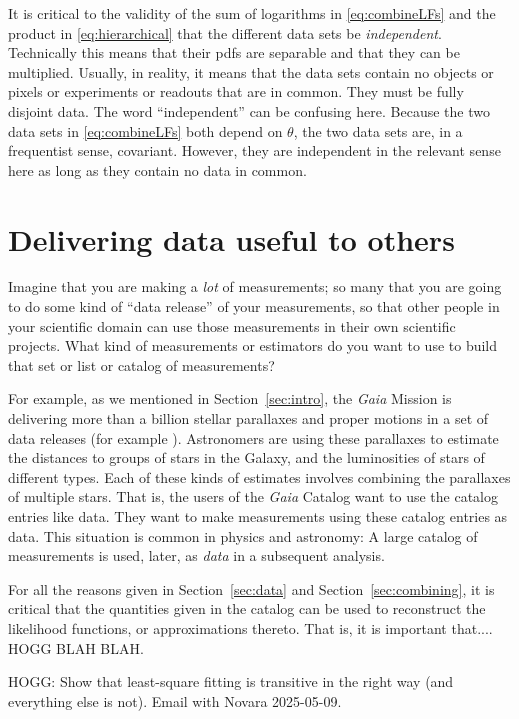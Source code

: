 \documentclass{article}
\newcommand{\sectionname}{Section}
\newcommand{\secref}[1]{\sectionname~\ref{#1}}
\begin{document}
It is critical to the validity of the sum of logarithms in \eqref{eq:combineLFs} and the product in \eqref{eq:hierarchical}
that the different data sets be \emph{independent}.
Technically this means that their pdfs are separable and that they can be multiplied.
Usually, in reality, it means that the data sets contain no objects or pixels or experiments or readouts that are in common.
They must be fully disjoint data.
The word ``independent'' can be confusing here.
Because the two data sets in \eqref{eq:combineLFs} both depend on $\theta$, the two data sets are, in a frequentist sense, covariant.
However, they are independent in the relevant sense here as long as they contain no data in common.

\section{Delivering data useful to others}\label{sec:catalogs}
Imagine that you are making a \emph{lot} of measurements; so many that you are going to do some kind of ``data release'' of your measurements, so that other people in your scientific domain can use those measurements in their own scientific projects.
What kind of measurements or estimators do you want to use to build that set or list or catalog of measurements?

For example, as we mentioned in \secref{sec:intro}, the \textsl{Gaia} Mission \cite{gaia} is delivering more than a billion stellar parallaxes and proper motions in a set of data releases (for example \cite{gaiadr3}).
Astronomers are using these parallaxes to estimate the distances to groups of stars in the Galaxy, and the luminosities of stars of different types.
Each of these kinds of estimates involves combining the parallaxes of multiple stars.
That is, the users of the \textsl{Gaia} Catalog want to use the catalog entries like data.
They want to make measurements using these catalog entries as data.
This situation is common in physics and astronomy:
A large catalog of measurements is used, later, as \emph{data} in a subsequent analysis.

For all the reasons given in \secref{sec:data} and \secref{sec:combining}, it is critical that the quantities given in the catalog can be used to reconstruct the likelihood functions, or approximations thereto.
That is, it is important that....
HOGG BLAH BLAH.

HOGG: Show that least-square fitting is transitive in the right way (and everything else is not). Email with Novara 2025-05-09.
\end{document}
